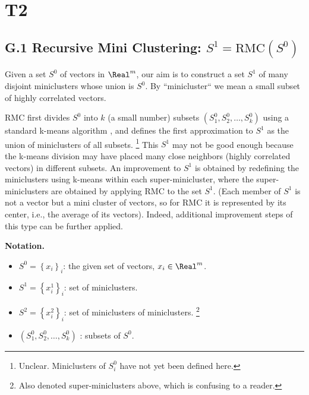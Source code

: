 \documentclass{article} %
\begin{document}
\section{T2}
\subsection{G.1 Recursive Mini Clustering: $S^1 = \text{RMC}(S^0)$}
Given a set $S^0$ of vectors in $\Real^m$, our aim is to construct a set $S^1$ of many disjoint miniclusters whose union is $S^0$. By ``minicluster`` we mean a small subset of highly correlated vectors.

RMC first divides $S^0$ into $k$ (a small number) subsets $(S^0_1,S^0_2,\dots,S^0_k)$ using a standard k-means algorithm \cite{kmeans}, and defines the first approximation to $S^1$ as the union of miniclusters of all subsets. \footnote{Unclear. Miniclusters of $S^0_i$ have not yet been defined here.} This $S^1$ may not be good enough because the k-means division may have placed many close neighbors (highly correlated vectors) in different subsets. An improvement to $S^1$ is obtained by redefining the miniclusters using k-means within each super-minicluster, where the super-miniclusters are obtained by applying RMC to the set $S^1$. (Each member of $S^1$ is not a vector but a mini cluster of vectors, so for RMC it is represented by its center, i.e., the average of its vectors). Indeed, additional improvement steps of this type can be further applied.

{\bf Notation.}
\begin{itemize}
    \item $S^0 = \left\{x_i\right\}_i$: the given set of vectors, $x_i \in \Real^m$.
    \item $S^1 = \left\{x_i^1\right\}_i$: set of miniclusters.
    \item $S^2 = \left\{x_i^2\right\}_i$: set of miniclusters of miniclusters. \footnote{Also denoted super-miniclusters above, which is confusing to a reader.}
    \item $(S^0_1,S^0_2,\dots,S^0_k)$ : subsets of $S^0$.
\end{itemize}
\end{document}
